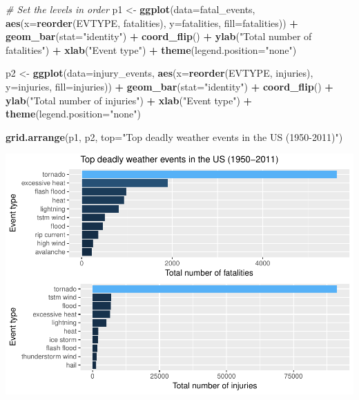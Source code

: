 \documentclass[]{article}
\newenvironment{Shaded}{\begin{snugshade}}{\end{snugshade}}
\newcommand{\KeywordTok}[1]{\textcolor[rgb]{0.13,0.29,0.53}{\textbf{#1}}}
\newcommand{\DataTypeTok}[1]{\textcolor[rgb]{0.13,0.29,0.53}{#1}}
\newcommand{\StringTok}[1]{\textcolor[rgb]{0.31,0.60,0.02}{#1}}
\newcommand{\CommentTok}[1]{\textcolor[rgb]{0.56,0.35,0.01}{\textit{#1}}}
\newcommand{\OperatorTok}[1]{\textcolor[rgb]{0.81,0.36,0.00}{\textbf{#1}}}
\newcommand{\NormalTok}[1]{#1}
\begin{document}
\begin{Shaded}
\begin{Highlighting}[]
\CommentTok{# Set the levels in order}
\NormalTok{p1 <-}\StringTok{ }\KeywordTok{ggplot}\NormalTok{(}\DataTypeTok{data=}\NormalTok{fatal_events,}
             \KeywordTok{aes}\NormalTok{(}\DataTypeTok{x=}\KeywordTok{reorder}\NormalTok{(EVTYPE, fatalities), }\DataTypeTok{y=}\NormalTok{fatalities, }\DataTypeTok{fill=}\NormalTok{fatalities)) }\OperatorTok{+}
\StringTok{    }\KeywordTok{geom_bar}\NormalTok{(}\DataTypeTok{stat=}\StringTok{"identity"}\NormalTok{) }\OperatorTok{+}
\StringTok{    }\KeywordTok{coord_flip}\NormalTok{() }\OperatorTok{+}
\StringTok{    }\KeywordTok{ylab}\NormalTok{(}\StringTok{"Total number of fatalities"}\NormalTok{) }\OperatorTok{+}
\StringTok{    }\KeywordTok{xlab}\NormalTok{(}\StringTok{"Event type"}\NormalTok{) }\OperatorTok{+}
\StringTok{    }\KeywordTok{theme}\NormalTok{(}\DataTypeTok{legend.position=}\StringTok{"none"}\NormalTok{)}

\NormalTok{p2 <-}\StringTok{ }\KeywordTok{ggplot}\NormalTok{(}\DataTypeTok{data=}\NormalTok{injury_events,}
             \KeywordTok{aes}\NormalTok{(}\DataTypeTok{x=}\KeywordTok{reorder}\NormalTok{(EVTYPE, injuries), }\DataTypeTok{y=}\NormalTok{injuries, }\DataTypeTok{fill=}\NormalTok{injuries)) }\OperatorTok{+}
\StringTok{    }\KeywordTok{geom_bar}\NormalTok{(}\DataTypeTok{stat=}\StringTok{"identity"}\NormalTok{) }\OperatorTok{+}
\StringTok{    }\KeywordTok{coord_flip}\NormalTok{() }\OperatorTok{+}\StringTok{ }
\StringTok{    }\KeywordTok{ylab}\NormalTok{(}\StringTok{"Total number of injuries"}\NormalTok{) }\OperatorTok{+}
\StringTok{    }\KeywordTok{xlab}\NormalTok{(}\StringTok{"Event type"}\NormalTok{) }\OperatorTok{+}
\StringTok{    }\KeywordTok{theme}\NormalTok{(}\DataTypeTok{legend.position=}\StringTok{"none"}\NormalTok{)}

\KeywordTok{grid.arrange}\NormalTok{(p1, p2, }\DataTypeTok{top=}\StringTok{"Top deadly weather events in the US (1950-2011)"}\NormalTok{)}
\end{Highlighting}
\end{Shaded}

\includegraphics{storm_files/figure-latex/unnamed-chunk-11-1.pdf}
\end{document}
